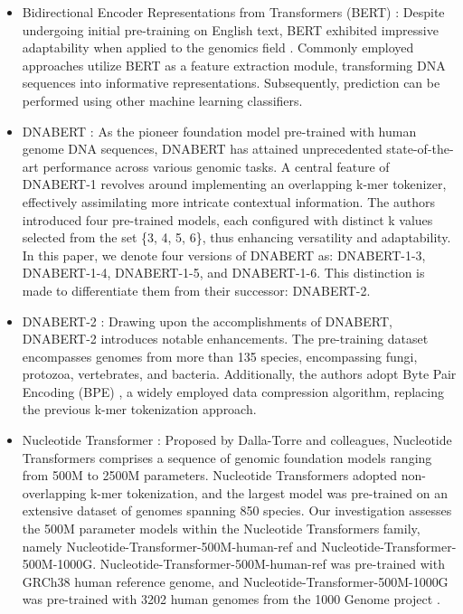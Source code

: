 \documentclass[a4paper,fleqn]{cas-dc}
\begin{document}
\begin{itemize}
    \item Bidirectional Encoder Representations from Transformers (BERT) \cite{Devlin2019}: Despite undergoing initial pre-training on English text, BERT exhibited impressive adaptability when applied to the genomics field \cite{Le2021, Charoenkwan2021}. Commonly employed approaches utilize BERT as a feature extraction module, transforming DNA sequences into informative representations. Subsequently, prediction can be performed using other machine learning classifiers.
    \item DNABERT \cite{Ji2021}: As the pioneer foundation model pre-trained with human genome DNA sequences, DNABERT has attained unprecedented state-of-the-art performance across various genomic tasks. A central feature of DNABERT-1 revolves around implementing an overlapping k-mer tokenizer, effectively assimilating more intricate contextual information. The authors introduced four pre-trained models, each configured with distinct k values selected from the set \{3, 4, 5, 6\}, thus enhancing versatility and adaptability. In this paper, we denote four versions of DNABERT as: DNABERT-1-3, DNABERT-1-4, DNABERT-1-5, and DNABERT-1-6. This distinction is made to differentiate them from their successor: DNABERT-2.
    \item DNABERT-2 \cite{Zhou2023}: Drawing upon the accomplishments of DNABERT, DNABERT-2 introduces notable enhancements. The pre-training dataset encompasses genomes from more than 135 species, encompassing fungi, protozoa, vertebrates, and bacteria. Additionally, the authors adopt Byte Pair Encoding (BPE) \cite{Sennrich2016}, a widely employed data compression algorithm, replacing the previous k-mer tokenization approach.
    \item Nucleotide Transformer \cite{DallaTorre2023}: Proposed by Dalla-Torre and colleagues, Nucleotide Transformers comprises a sequence of genomic foundation models ranging from 500M to 2500M parameters. Nucleotide Transformers adopted non-overlapping k-mer tokenization, and the largest model was pre-trained on an extensive dataset of genomes spanning 850 species. Our investigation assesses the 500M parameter models within the Nucleotide Transformers family, namely Nucleotide-Transformer-500M-human-ref and Nucleotide-Transformer-500M-1000G. Nucleotide-Transformer-500M-human-ref was pre-trained with GRCh38 human reference genome, and Nucleotide-Transformer-500M-1000G was pre-trained with 3202 human genomes from the 1000 Genome project \cite{ByrskaBishop2021}.
\end{itemize}
\end{document}
